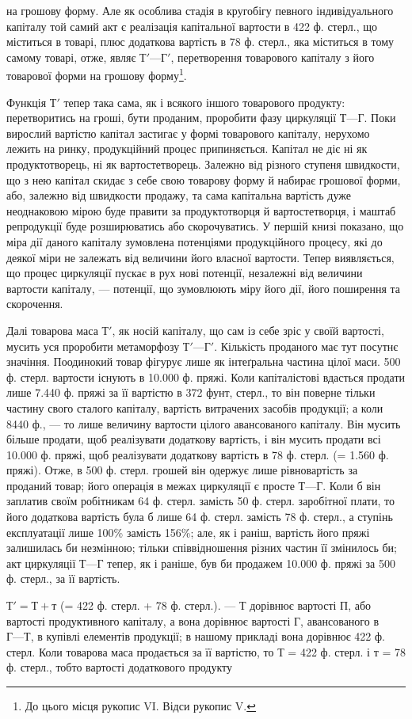 \parcont{}  %
на грошову форму. Але як особлива стадія в кругобігу певного індивідуального
капіталу той самий акт є реалізація капітальної вартости
в 422 ф. стерл., що міститься в товарі, плюс додаткова вартість в 78 ф.
стерл., яка міститься в тому самому товарі, отже, являє $Т' — Г'$, перетворення
товарового капіталу з його товарової форми на грошову форму\footnote{
До цього місця рукопис VI. Відси рукопис V.
}.

Функція $Т'$ тепер така сама, як і всякого іншого товарового продукту:
перетворитись на гроші, бути проданим, проробити фазу циркуляції
$Т — Г$. Поки вирослий вартістю капітал застигає у формі товарового
капіталу, нерухомо лежить на ринку, продукційний процес припиняється.
Капітал не діє ні як продуктотворець, ні як вартостетворець. Залежно від
різного ступеня швидкости, що з нею капітал скидає з себе свою товарову
форму й набирає грошової форми, або, залежно від швидкости продажу,
та сама капітальна вартість дуже неоднаковою мірою буде правити за
продуктотворця й вартостетворця, і маштаб репродукції буде розширюватись
або скорочуватись. У першій книзі показано, що міра дії даного
капіталу зумовлена потенціями продукційного процесу, які до деякої
міри не залежать від величини його власної вартости. Тепер виявляється,
що процес циркуляції пускає в рух нові потенції, незалежні від величини
вартости капіталу, — потенції, що зумовлюють міру його дії, його поширення
та скорочення.

Далі товарова маса $Т'$, як носій капіталу, що сам із себе зріс у своїй
вартості, мусить уся проробити метаморфозу $Т' — Г'$. Кількість проданого
має тут посутнє значіння. Поодинокий товар фігурує лише як інтеґральна
частина цілої маси. 500 ф. стерл. вартости існують в 10.000 ф. пряжі.
Коли капіталістові вдасться продати лише 7.440 ф. пряжі за її вартістю
в 372 фунт, стерл., то він поверне тільки частину свого сталого капіталу,
вартість витрачених засобів продукції; а коли 8440 ф., — то лише величину
вартости цілого авансованого капіталу. Він мусить більше продати, щоб
реалізувати додаткову вартість, і він мусить продати всі 10.000 ф.
пряжі, щоб реалізувати додаткову вартість в 78 ф. стерл. (= 1.560 ф.
пряжі). Отже, в 500 ф. стерл. грошей він одержує лише рівновартість
за проданий товар; його операція в межах циркуляції є просте $Т — Г$.
Коли б він заплатив своїм робітникам 64 ф. стерл. замість 50 ф. стерл.
заробітної плати, то його додаткова вартість була б лише 64 ф. стерл.
замість 78 ф. стерл., а ступінь експлуатації лише 100\% замість
156\%; але, як і раніш, вартість його пряжі залишилась би незмінною;
тільки співвідношення різних частин її змінилось би; акт циркуляції $Т — Г$
тепер, як і раніше, був би продажем 10.000 ф. пряжі за 500 ф. стерл.,
за її вартість.

$Т' = Т + т$ (= 422 ф. стерл. + 78 ф. стерл.). — $Т$ дорівнює вартості $П$,
або вартості продуктивного капіталу, а вона дорівнює вартості $Г$, авансованого
в $Г — Т$, в купівлі елементів продукції; в нашому прикладі вона
дорівнює 422 ф. стерл. Коли товарова маса продається за її вартістю, то
$Т$ = 422 ф. стерл. і $т$ = 78 ф. стерл., тобто вартості додаткового продукту
\parbreak{}  %
